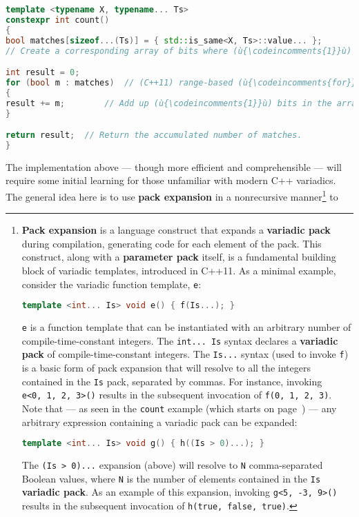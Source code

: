 \begin{lstlisting}[language=C++]
template <typename X, typename... Ts>
constexpr int count()
{
bool matches[sizeof...(Ts)] = { std::is_same<X, Ts>::value... };
// Create a corresponding array of bits where (ù{\codeincomments{1}}ù) indicates sameness.

int result = 0;
for (bool m : matches)  // (C++11) range-based (ù{\codeincomments{for}}ù) loop
{
result += m;        // Add up (ù{\codeincomments{1}}ù) bits in the array.
}

return result;  // Return the accumulated number of matches.
}
\end{lstlisting}

\noindent The implementation above --- though more efficient and comprehensible
--- will require some initial learning for those unfamiliar with modern
C++ variadics. The general idea here is to use \textbf{pack expansion}
in a nonrecursive manner{\cprotect\footnote{\textbf{Pack expansion} is
a language construct that expands a \textbf{variadic pack} during
compilation, generating code for each element of the pack. This
construct, along with a \textbf{parameter pack} itself, is a
fundamental building block of variadic templates,
introduced in C++11. As a minimal example, consider the variadic
function template, \texttt{e}:

\begin{lstlisting}[language=C++, basicstyle={\ttfamily\footnotesize}]
template <int... Is> void e() { f(Is...); }
\end{lstlisting}

\noindent \texttt{e} is a function template that can be instantiated
with an arbitrary number of compile-time-constant integers. The
\texttt{int...}~\texttt{Is} syntax declares a \textbf{variadic pack}
of compile-time-constant integers. The \texttt{Is...} syntax (used to
invoke \texttt{f}) is a basic form of pack expansion that will resolve
to all the integers contained in the \texttt{Is} pack, separated by
commas. For instance, invoking
\texttt{e<0,}~\texttt{1,}~\texttt{2,}~\texttt{3>()} results in the
subsequent invocation of
\texttt{f(0,}~\texttt{1,}~\texttt{2,}~\texttt{3)}. Note that --- as
seen in the \texttt{count} example (which starts on page~\pageref{relaxedconstexpr-countcode}) --- any arbitrary
expression containing a variadic pack can be expanded:

\begin{lstlisting}[language=C++, basicstyle={\ttfamily\footnotesize}]
template <int... Is> void g() { h((Is > 0)...); }
\end{lstlisting}

\noindent The \texttt{(Is}~\texttt{>}~\texttt{0)...} expansion (above) will
resolve to \texttt{N} comma-separated Boolean values, where \texttt{N}
is the number of elements contained in the \texttt{Is}
\textbf{variadic pack}. As an example of this expansion, invoking
\texttt{g<5,}~\texttt{-3,}~\texttt{9>()} results in the subsequent invocation of \texttt{h(true,}~\texttt{false,}~\texttt{true)}.}} to
